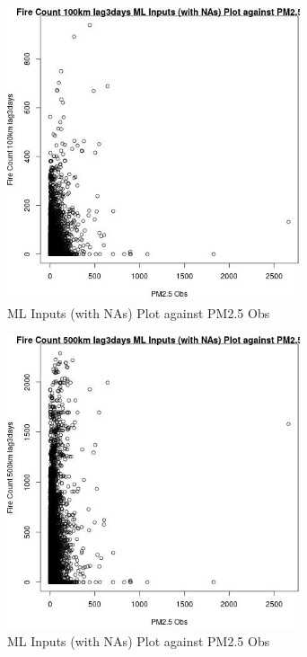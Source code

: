 \begin{figure} 
\centering  
\includegraphics[width=0.77\textwidth]{Code_Outputs/Report_ML_input_PM25_Step4_part_e_de_duplicated_aves_compiled_2019-05-20wNAs_Fire_Count_100km_lag3daysvPM25_Obs.jpg} 
\caption{\label{fig:Report_ML_input_PM25_Step4_part_e_de_duplicated_aves_compiled_2019-05-20wNAsFire_Count_100km_lag3daysvPM25_Obs}ML Inputs (with NAs) Plot against PM2.5 Obs} 
\end{figure} 
 

\begin{figure} 
\centering  
\includegraphics[width=0.77\textwidth]{Code_Outputs/Report_ML_input_PM25_Step4_part_e_de_duplicated_aves_compiled_2019-05-20wNAs_Fire_Count_500km_lag3daysvPM25_Obs.jpg} 
\caption{\label{fig:Report_ML_input_PM25_Step4_part_e_de_duplicated_aves_compiled_2019-05-20wNAsFire_Count_500km_lag3daysvPM25_Obs}ML Inputs (with NAs) Plot against PM2.5 Obs} 
\end{figure} 
 

